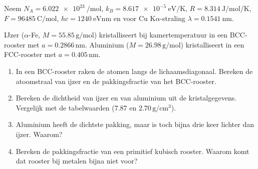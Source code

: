
Neem $N_A = \SI{6.022e23}{\per\mole}$, $k_B = \SI{8.617e-5}{\electronvolt\per\kelvin}$, $R = \SI{8.314}{\joule\per\mole\per\kelvin}$, $F = \SI{96485}{\coulomb\per\mole}$, $hc = \SI{1240}{\electronvolt\nano\metre}$ en voor Cu K$\alpha$-straling $\lambda = \SI{0.1541}{\nano\metre}$.

\begin{oefening}
IJzer (\(\alpha\)-Fe, \(M = 55.85\,\mathrm{g/mol}\)) kristalliseert bij kamertemperatuur in een BCC-rooster met \(a = 0.2866\,\mathrm{nm}\). Aluminium (\(M = 26.98\,\mathrm{g/mol}\)) kristalliseert in een FCC-rooster met \(a = 0.405\,\mathrm{nm}\).

\begin{enumerate}
\item[(a)]
  In een BCC-rooster raken de atomen langs de lichaamsdiagonaal. Bereken de atoomstraal van ijzer en de pakkingsfractie van het BCC-rooster.
\item[(b)]
  Bereken de dichtheid van ijzer en van aluminium uit de kristalgegevens. Vergelijk met de tabelwaarden (\(7.87\) en \(2.70\,\mathrm{g/cm^3}\)).
\item[(c)]
  Aluminium heeft de dichtste pakking, maar is toch bijna drie keer lichter dan ijzer. Waarom?
\item[(d)]
  Bereken de pakkingsfractie van een primitief kubisch rooster. Waarom komt dat rooster bij metalen bijna niet voor?
\end{enumerate}
\end{oefening}
